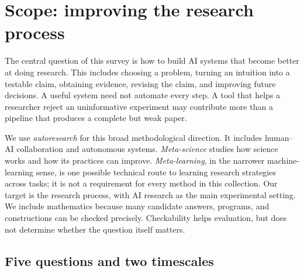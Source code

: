 \section{Scope: improving the research process}
\label{sec:scope}

The central question of this survey is how to build AI systems that become better at doing research. This includes choosing a problem, turning an intuition into a testable claim, obtaining evidence, revising the claim, and improving future decisions. A useful system need not automate every step. A tool that helps a researcher reject an uninformative experiment may contribute more than a pipeline that produces a complete but weak paper.

We use \emph{autoresearch} for this broad methodological direction. It includes human--AI collaboration and autonomous systems. \emph{Meta-science} studies how science works and how its practices can improve. \emph{Meta-learning}, in the narrower machine-learning sense, is one possible technical route to learning research strategies across tasks; it is not a requirement for every method in this collection. Our target is the research process, with AI research as the main experimental setting. We include mathematics because many candidate answers, programs, and constructions can be checked precisely. Checkability helps evaluation, but does not determine whether the question itself matters.

\subsection{Five questions and two timescales}

